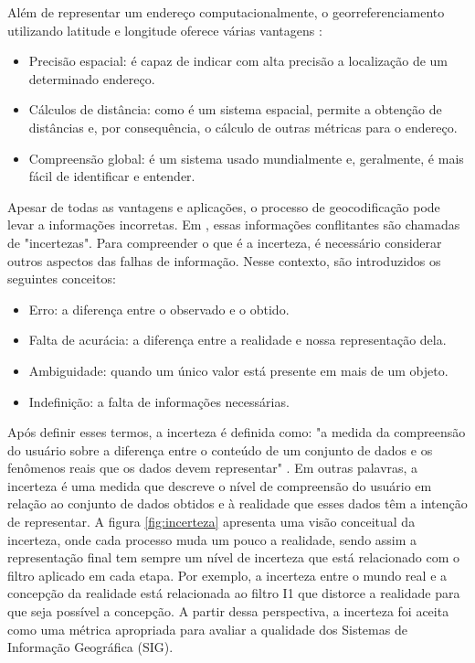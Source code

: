 Além de representar um endereço computacionalmente, o georreferenciamento utilizando latitude e longitude oferece várias vantagens \cite{longley2013}:

\begin{itemize}
   \item Precisão espacial: é capaz de indicar com alta precisão a localização de um determinado endereço.
   \item Cálculos de distância: como é um sistema espacial, permite a obtenção de distâncias e, por consequência, o cálculo de outras métricas para o endereço.
   \item Compreensão global: é um sistema usado mundialmente e, geralmente, é mais fácil de identificar e entender.
\end{itemize}

Apesar de todas as vantagens e aplicações, o processo de geocodificação pode levar a informações incorretas. Em \cite{longley2013},  essas informações conflitantes são chamadas de "incertezas". Para compreender o que é a incerteza, é necessário considerar outros aspectos das falhas de informação. Nesse contexto, são introduzidos os seguintes conceitos:

\begin{itemize}
   \item Erro: a diferença entre o observado e o obtido.
   \item Falta de acurácia: a diferença entre a realidade e nossa representação dela.
   \item Ambiguidade: quando um único valor está presente em mais de um objeto.
   \item Indefinição: a falta de informações necessárias.
\end{itemize}

Após definir esses termos, a incerteza é definida como: "a medida da compreensão do usuário sobre a diferença entre o conteúdo de um conjunto de dados e os fenômenos reais que os dados devem representar" \cite{longley2013}. Em outras palavras, a incerteza é uma medida que descreve o nível de compreensão do usuário em relação ao conjunto de dados obtidos e à realidade que esses dados têm a intenção de representar. A figura \ref{fig:incerteza} apresenta uma visão conceitual da incerteza, onde cada processo muda um pouco a realidade, sendo assim a representação final tem sempre um nível de incerteza que está relacionado com o filtro aplicado em cada etapa. Por exemplo, a incerteza entre o mundo real e a concepção da realidade está relacionada ao filtro I1 que distorce a realidade para que seja possível a concepção.  A partir dessa perspectiva, a incerteza foi aceita como uma métrica apropriada para avaliar a qualidade dos Sistemas de Informação Geográfica (SIG).

